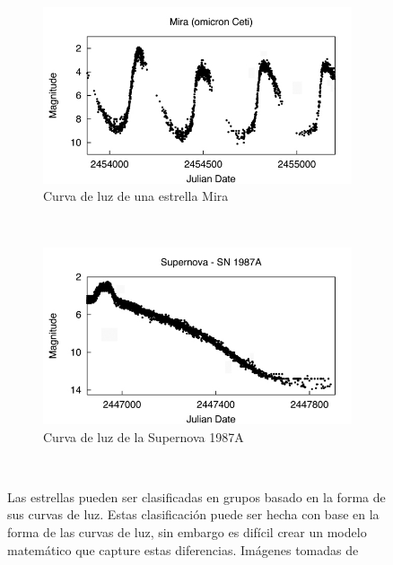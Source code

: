 \documentclass[letterpaper,12pt]{book}
\begin{document}
\begin{figure}
  \centering
  \begin{subfigure}[b]{0.5\textwidth}
    \includegraphics[width=\textwidth]{./img/CProblema/omicet.jpg}
    \caption{Curva de luz de una estrella Mira}
    \label{fig:gull}
  \end{subfigure}%
  ~ %
  \begin{subfigure}[b]{0.5\textwidth}
    \includegraphics[width=\textwidth]{./img/CProblema/sn1987a.jpg}
    \caption{Curva de luz de la Supernova 1987A}
    \label{fig:tiger}
  \end{subfigure}
  ~ %
  \caption{Las estrellas pueden ser clasificadas en grupos basado en la forma de sus curvas de luz. Estas clasificación puede ser hecha con base en la forma de las curvas de luz, sin embargo es difícil crear un modelo matemático que capture estas diferencias. Imágenes tomadas de \cite{bsj_types_2012}}\label{fig:dosCurvas}
\end{figure} 
\end{document}
